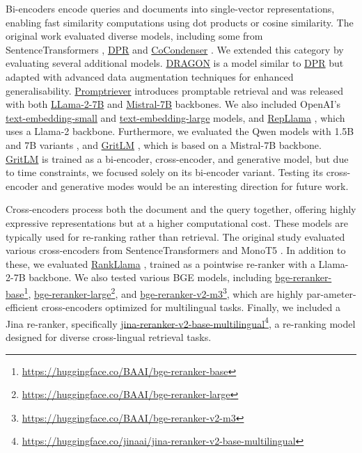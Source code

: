 Bi-encoders encode queries and documents into single-vector representations, enabling fast similarity computations using dot products or cosine similarity. The original work evaluated diverse models, including some from SentenceTransformers \cite{sentencetransformers}, \url{DPR} \cite{dpr} and \url{CoCondenser} \cite{gao-callan-2022-unsupervised}. We extended this category by evaluating several additional models. \url{DRAGON} \cite{dragon} is a model similar to \url{DPR} but adapted with advanced data augmentation techniques for enhanced generalisability. \url{Promptriever} \cite{promptriever} introduces promptable retrieval and was released with both \url{LLama-2-7B} and \url{Mistral-7B} backbones. We also included OpenAI's \url{text-embedding-small} and \url{text-embedding-large} models, and \url{RepLlama} \cite{repllama_rankllama}, which uses a Llama-2 backbone. Furthermore, we evaluated the Qwen models with 1.5B and 7B variants \cite{yang2024qwen2technicalreport}, and \url{GritLM} \cite{gritlm}, which is based on a Mistral-7B backbone. \url{GritLM} is trained as a bi-encoder, cross-encoder, and generative model, but due to time constraints, we focused solely on its bi-encoder variant. Testing its cross-encoder and generative modes would be an interesting direction for future work.

Cross-encoders process both the document and the query together, offering highly expressive representations but at a higher computational cost. These models are typically used for re-ranking rather than retrieval. The original study evaluated various cross-encoders from SentenceTransformers \cite{sentencetransformers} and MonoT5 \cite{nogueira-etal-2020-document}. In addition to these, we evaluated \url{RankLlama} \cite{repllama_rankllama}, trained as a pointwise re-ranker with a Llama-2-7B backbone. We also tested various BGE models, including \url{bge-reranker-base}\footnote{\url{https://huggingface.co/BAAI/bge-reranker-base}}, \url{bge-reranker-large}\footnote{\url{https://huggingface.co/BAAI/bge-reranker-large}}, and \url{bge-reranker-v2-m3}\footnote{\url{https://huggingface.co/BAAI/bge-reranker-v2-m3}}, which are highly par-ameter-efficient cross-encoders optimized for multilingual tasks. Finally, we included a Jina re-ranker, specifically \url{jina-reranker-v2-base-multilingual}\footnote{\url{https://huggingface.co/jinaai/jina-reranker-v2-base-multilingual}}, a re-ranking model designed for diverse cross-lingual retrieval tasks.

